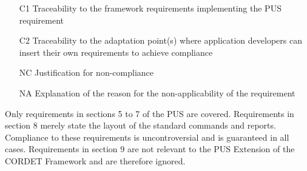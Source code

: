 \documentclass{pnp_article}
\begin{document}
\begin{itemize}
\item [C1] Traceability to the framework requirements implementing the PUS requirement 
\item [C2] Traceability to the adaptation point(s) where application developers can insert their own requirements to achieve compliance
\item [NC] Justification for non-compliance
\item [NA] Explanation of the reason for the non-applicability of the requirement
\end{itemize}

Only requirements in sections 5 to 7 of the PUS are covered. Requirements in section 8 merely state the layout of the standard commands and reports. Compliance to these requirements is uncontroversial and is guaranteed in all cases. Requirements in section 9 are not relevant to the PUS Extension of the CORDET Framework and are therefore ignored.

\begin{landscape} 



\end{landscape}
\end{document}
